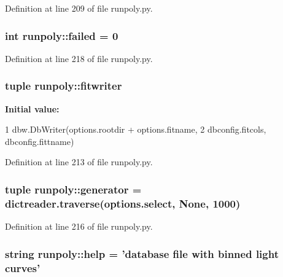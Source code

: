 Definition at line 209 of file runpoly.py.

\hypertarget{namespacerunpoly_a77eea5c10faa8e40af7173ac7eda3478}{
\subsubsection[{failed}]{\setlength{\rightskip}{0pt plus 5cm}int {\bf runpoly::failed} = 0}}
\label{namespacerunpoly_a77eea5c10faa8e40af7173ac7eda3478}


Definition at line 218 of file runpoly.py.

\hypertarget{namespacerunpoly_a270c35c20bdd6aa659cab1358e8f9475}{
\subsubsection[{fitwriter}]{\setlength{\rightskip}{0pt plus 5cm}tuple {\bf runpoly::fitwriter}}}
\label{namespacerunpoly_a270c35c20bdd6aa659cab1358e8f9475}
{\bfseries Initial value:}
\begin{DoxyCode}
1 dbw.DbWriter(options.rootdir + options.fitname, 
2                               dbconfig.fitcols, dbconfig.fittname)
\end{DoxyCode}


Definition at line 213 of file runpoly.py.

\hypertarget{namespacerunpoly_a66f644ff5f02e8d9724a514873ac1be4}{
\subsubsection[{generator}]{\setlength{\rightskip}{0pt plus 5cm}tuple {\bf runpoly::generator} = dictreader.traverse(options.select, None, 1000)}}
\label{namespacerunpoly_a66f644ff5f02e8d9724a514873ac1be4}


Definition at line 216 of file runpoly.py.

\hypertarget{namespacerunpoly_a7258195372f4a253f10006e02792d22b}{
\subsubsection[{help}]{\setlength{\rightskip}{0pt plus 5cm}string {\bf runpoly::help} = 'database file with binned light curves'}}
\label{namespacerunpoly_a7258195372f4a253f10006e02792d22b}


